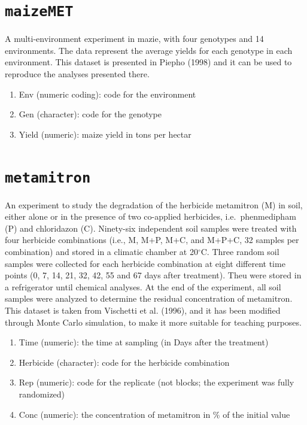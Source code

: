 \documentclass[
  letterpaper,
  DIV=11,
  numbers=noendperiod]{scrreprt}
\providecommand{\tightlist}{%
  \setlength{\itemsep}{0pt}\setlength{\parskip}{0pt}}
\begin{document}
\section*{\texorpdfstring{\texttt{maizeMET}}{maizeMET}}\label{maizeMET}


A multi-environment experiment in mazie, with four genotypes and 14
environments. The data represent the average yields for each genotype in
each environment. This dataset is presented in Piepho (1998) and it can
be used to reproduce the analyses presented there.

\begin{enumerate}
\def\labelenumi{\arabic{enumi}.}
\tightlist
\item
  Env (numeric coding): code for the environment
\item
  Gen (character): code for the genotype
\item
  Yield (numeric): maize yield in tons per hectar
\end{enumerate}

\section*{\texorpdfstring{\texttt{metamitron}}{metamitron}}\label{metamitron}


An experiment to study the degradation of the herbicide metamitron (M)
in soil, either alone or in the presence of two co-applied herbicides,
i.e.~phenmedipham (P) and chloridazon (C). Ninety-six independent soil
samples were treated with four herbicide combinations (i.e., M, M+P,
M+C, and M+P+C, 32 samples per combination) and stored in a climatic
chamber at 20\(^{\circ}\)C. Three random soil samples were collected for
each herbicide combination at eight different time points (0, 7, 14, 21,
32, 42, 55 and 67 days after treatment). Theu were stored in a
refrigerator until chemical analyses. At the end of the experiment, all
soil samples were analyzed to determine the residual concentration of
metamitron. This dataset is taken from Vischetti et al. (1996), and it
has been modified through Monte Carlo simulation, to make it more
suitable for teaching purposes.

\begin{enumerate}
\def\labelenumi{\arabic{enumi}.}
\tightlist
\item
  Time (numeric): the time at sampling (in Days after the treatment)
\item
  Herbicide (character): code for the herbicide combination
\item
  Rep (numeric): code for the replicate (not blocks; the experiment was
  fully randomized)
\item
  Conc (numeric): the concentration of metamitron in \% of the initial
  value
\end{enumerate}
\end{document}

